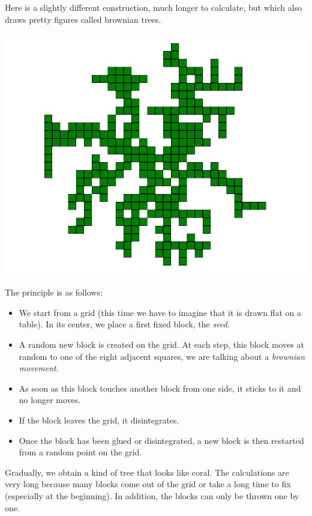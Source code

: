 \documentclass[11pt,class=report,crop=false]{standalone}
\begin{document}
\begin{cours}

Here is a slightly different construction, much longer to calculate, but which also draws pretty figures called \og{}brownian trees\fg{}.

\begin{center}
\includegraphics[scale=\myscale,scale=0.28]{screen-blocks-tree1}
\end{center}


The principle is as follows:
\begin{itemize}
  \item We start from a grid (this time we have to imagine that it is drawn flat on a table). In its center, we place a first fixed block, the \emph{seed}.
  
  \item A random new block is created on the grid. At each step, this block moves at random to one of the eight adjacent squares, we are talking about a \emph{brownian movement}. 

  \item As soon as this block touches another block from one side, it sticks to it and no longer moves.

  \item If the block leaves the grid, it disintegrates.
  
  \item Once the block has been glued or disintegrated, a new block is then restarted from a random point on the grid.
\end{itemize}



Gradually, we obtain a kind of tree that looks like coral. The calculations are very long because many blocks come out of the grid or take a long time to fix (especially at the beginning). In addition, the blocks can only be thrown one by one.

\end{cours}
\end{document}
